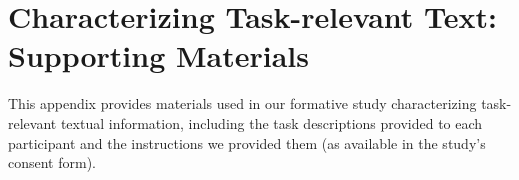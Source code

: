 \chapter{Characterizing Task-relevant Text: Supporting Materials}

This appendix provides materials used in our formative study characterizing task-relevant textual information,
including the task descriptions provided to each participant and the instructions we provided them (as available in the study's consent form).








